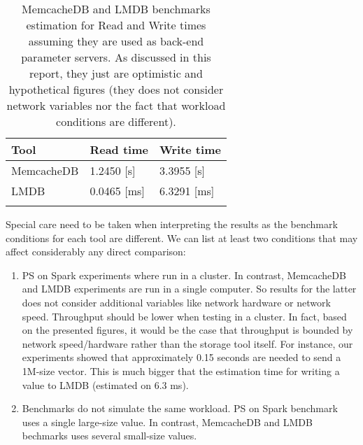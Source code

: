 \begin{longtable}{m{2.5cm} m{2.5cm} m{2.5cm} }
\hline
Tool & Read time & Write time \\
\hline
\rowcolor[gray]{0.9}
MemcacheDB & 1.2450 [s] & 3.3955 [s] \\
LMDB       & 0.0465 [ms] & 6.3291 [ms] \\
\hline
\caption{MemcacheDB and LMDB benchmarks estimation for Read and Write times assuming they are used as back-end parameter servers. As discussed in this report, they just are optimistic and hypothetical figures (they does not consider network variables nor the fact that workload conditions are different). }
\label{table:tools_times}
\end{longtable}

Special care need to be taken when interpreting the results as the benchmark conditions for each tool are different. We can list at least two conditions that may affect considerably any direct comparison:
\begin{enumerate}
  \item PS on Spark experiments where run in a cluster. In contrast, MemcacheDB and LMDB experiments are run in a single computer. So results for the latter does not consider additional variables like network hardware or network speed. Throughput should be lower when testing in a cluster. In fact, based on the presented figures, it would be the case that throughput is bounded by network speed/hardware rather than the storage tool itself. For instance, our experiments showed that approximately 0.15 seconds are needed to send a 1M-size vector. This is much bigger that the estimation time for writing a value to LMDB (estimated on 6.3 ms). 
  \item Benchmarks do not simulate the same workload. PS on Spark benchmark uses a single large-size value. In contrast, MemcacheDB and LMDB bechmarks uses several small-size values.
\end{enumerate}
